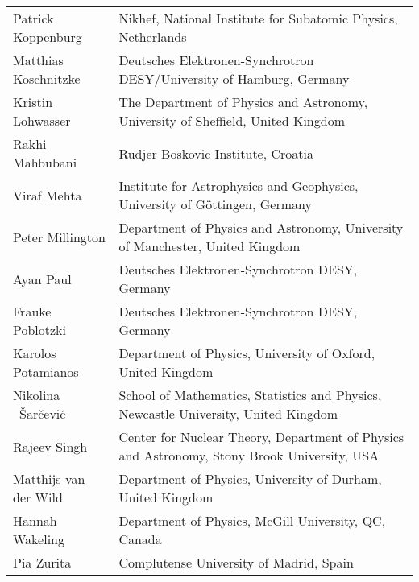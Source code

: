 \documentclass[../SustainableHEP.tex]{subfiles}
\begin{document}
\begin{longtable*}{@{}m{0.3\textwidth} p{0.7\textwidth}}
Patrick Koppenburg & Nikhef, National Institute for Subatomic Physics, Netherlands\\ %

Matthias Koschnitzke & Deutsches Elektronen-Synchrotron DESY/University of Hamburg, Germany \\ %

Kristin Lohwasser & The Department of Physics and Astronomy, University of Sheffield, United Kingdom\\ %

Rakhi Mahbubani & Rudjer Boskovic Institute, Croatia\\

Viraf Mehta & Institute for Astrophysics and Geophysics, University of G\"ottingen, Germany\\

Peter Millington & Department of Physics and Astronomy, University of Manchester, United Kingdom\\ %

Ayan Paul & Deutsches Elektronen-Synchrotron DESY, Germany \\ %

Frauke Poblotzki & Deutsches Elektronen-Synchrotron DESY,  Germany \\ %

Karolos Potamianos & Department of Physics, University of Oxford, United Kingdom \\ %

Nikolina ~\v{S}ar\v{c}evi\'c &
School of Mathematics, Statistics and Physics, Newcastle University, United Kingdom \\ %

Rajeev Singh & Center for Nuclear Theory, Department of Physics and Astronomy, Stony Brook University, USA\\

Matthijs van der Wild & Department of Physics, University of Durham, United Kingdom\\

Hannah Wakeling & Department of Physics, McGill University, QC, Canada\\ %

Pia Zurita & Complutense University of Madrid, Spain

\end{longtable*}
\renewcommand{\arraystretch}{1}
\end{document}

